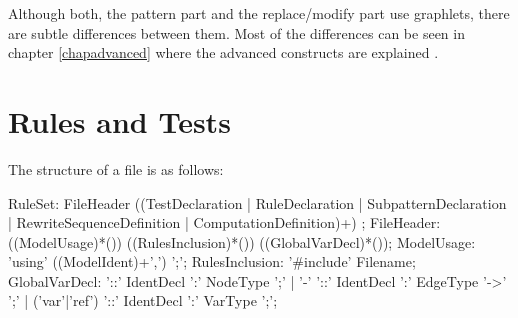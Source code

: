 \begin{figure}[htbp]
\end{figure}

\begin{warning}
	Although both, the pattern part and the replace/modify part use graphlets, there are subtle differences between them.
	Most of the differences can be seen in chapter \ref{chapadvanced} where the advanced constructs are explained .
\end{warning}


\section{Rules and Tests}
\label{ruledecls}
The structure of a  file is as follows:
\begin{rail}
  RuleSet: FileHeader ((TestDeclaration | RuleDeclaration | SubpatternDeclaration | RewriteSequenceDefinition | ComputationDefinition)+) ;
  FileHeader: ((ModelUsage)*()) ((RulesInclusion)*()) ((GlobalVarDecl)*());
  ModelUsage: 'using' ((ModelIdent)+',') ';';
  RulesInclusion: '\#include' Filename;
  GlobalVarDecl: '::' IdentDecl ':' NodeType ';' | '-' '::' IdentDecl ':' EdgeType '->' ';' | ('var'|'ref') '::' IdentDecl ':' VarType ';';
\end{rail}

